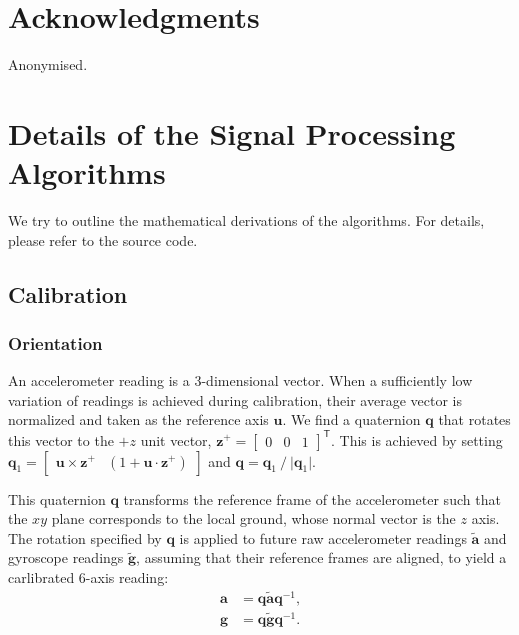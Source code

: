 \documentclass{nime-alternate} %
\begin{document}
\section{Acknowledgments}
Anonymised.


 

\appendix
\section{Details of the Signal Processing Algorithms}
\label{appendix:signal-processing}
We try to outline the mathematical derivations of the algorithms. For details, please refer to the source code.

\subsection{Calibration}
\subsubsection{Orientation}
\label{appendix:calib-ori}
An accelerometer reading is a 3-dimensional vector. When a sufficiently low variation of readings is achieved during calibration, their average vector is normalized and taken as the reference axis $\mathbf{u}$. We find a quaternion $\mathbf{q}$ that rotates this vector to the $+z$ unit vector, $\mathbf{z}^+ = \begin{bmatrix} 0 & 0 & 1 \end{bmatrix}^\mathsf{T}$. This is achieved by setting $\mathbf{q}_1 = \begin{bmatrix} \mathbf{u} \times \mathbf{z^+} & (1 + \mathbf{u} \cdot \mathbf{z^+}) \end{bmatrix}$ and $\mathbf{q} = \mathbf{q}_1 \mathbin{\mathop{/}} \lvert \mathbf{q}_1 \rvert$.

This quaternion $\mathbf{q}$ transforms the reference frame of the accelerometer such that the $xy$ plane corresponds to the local ground, whose normal vector is the $z$ axis. The rotation specified by $\mathbf{q}$ is applied to future raw accelerometer readings $\tilde{\mathbf{a}}$ and gyroscope readings $\tilde{\mathbf{g}}$, assuming that their reference frames are aligned, to yield a carlibrated 6-axis reading: %
\begin{equation}\label{eqn:calib-ori}
\begin{aligned}
\mathbf{a} &= \mathbf{q} \tilde{\mathbf{a}} \mathbf{q}^{-1}\text{,} \\
\mathbf{g} &= \mathbf{q} \tilde{\mathbf{g}} \mathbf{q}^{-1}\text{.} \\
\end{aligned}
\end{equation}
\end{document}
